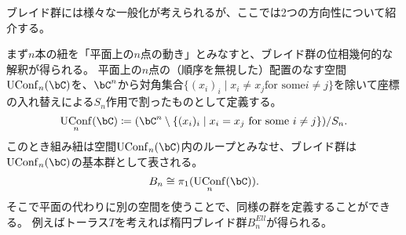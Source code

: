 \documentclass[uplatex,11pt,a4paper,dvipdfmx]{jsarticle}
\numberwithin{equation}{section}
\theoremstyle{definition}
\DeclareMathOperator{\UConf}{UConf}
\begin{document}
ブレイド群には様々な一般化が考えられるが、ここでは2つの方向性について紹介する。

まず$n$本の紐を「平面上の$n$点の動き」とみなすと、ブレイド群の位相幾何的な解釈が得られる。
平面上の$n$点の（順序を無視した）配置のなす空間$\UConf_n(\bC)$を、$\bC^n$から対角集合$\{(x_i)_i \mid x_i \neq x_j \text{for some} i \neq j\}$を除いて座標の入れ替えによる$S_n$作用で割ったものとして定義する。
\begin{equation}
    \UConf_n(\bC) \coloneq (\bC^n \setminus \{(x_i)_i \mid x_i = x_j \text{ for some } i \neq j\}) / S_n.
\end{equation}
このとき組み紐は空間$\UConf_n(\bC)$内のループとみなせ、ブレイド群は$\UConf_n(\bC)$の基本群として表される。
\begin{equation}
    B_n \cong \pi_1(\UConf_n(\bC)).
\end{equation}
そこで平面の代わりに別の空間を使うことで、同様の群を定義することができる。
例えばトーラス$T$を考えれば楕円ブレイド群$B^{Ell}_n$が得られる。
\end{document}
